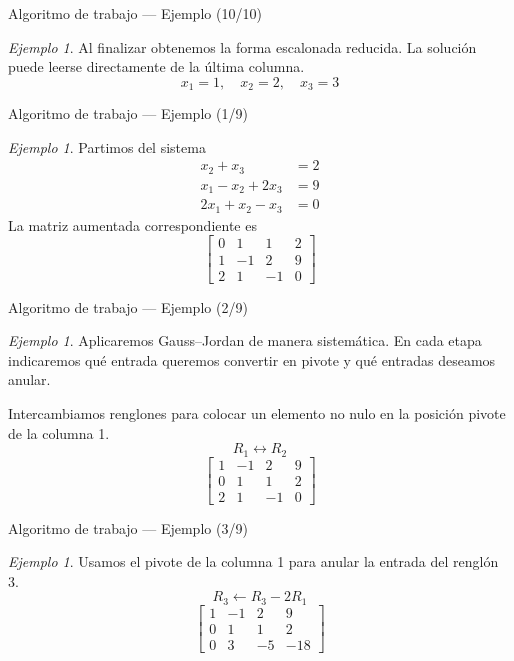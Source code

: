 \documentclass[aspectratio=169,11pt]{beamer}
\theoremstyle{remark}
\newtheorem{Ejem}[definicion]{Ejemplo}
\begin{document}
\begin{frame}{Algoritmo de trabajo — Ejemplo (10/10)}
\begin{Ejem}
Al finalizar obtenemos la forma escalonada reducida. La solución puede leerse directamente de la última columna.
\[
\boxed{x_{1}=1,\quad x_{2}=2,\quad x_{3}=3}
\]
\end{Ejem}
\end{frame}

\begin{frame}{Algoritmo de trabajo — Ejemplo (1/9)}
\begin{Ejem}
Partimos del sistema
\[
\begin{aligned}
x_{2} + x_{3} &= 2\\
x_{1} - x_{2} + 2 x_{3} &= 9\\
2 x_{1} + x_{2} - x_{3} &= 0
\end{aligned}
\]
La matriz aumentada correspondiente es
\[
\left[\begin{array}{ccc|c}
0 & 1 & 1 & 2\\
1 & -1 & 2 & 9\\
2 & 1 & -1 & 0
\end{array}\right]
\]
\end{Ejem}
\end{frame}

\begin{frame}{Algoritmo de trabajo — Ejemplo (2/9)}
\begin{Ejem}
Aplicaremos Gauss--Jordan de manera sistemática. En cada etapa indicaremos qué entrada queremos convertir en pivote y qué entradas deseamos anular.


Intercambiamos renglones para colocar un elemento no nulo en la posición pivote de la columna 1.
\[
R_{1}\leftrightarrow R_{2}
\]
\[
\left[\begin{array}{ccc|c}
1 & -1 & 2 & 9\\
0 & 1 & 1 & 2\\
2 & 1 & -1 & 0
\end{array}\right]
\]
\end{Ejem}
\end{frame}

\begin{frame}{Algoritmo de trabajo — Ejemplo (3/9)}
\begin{Ejem}
Usamos el pivote de la columna 1 para anular la entrada del renglón 3.
\[
R_{3}\leftarrow R_{3}-2R_{1}
\]
\[
\left[\begin{array}{ccc|c}
1 & -1 & 2 & 9\\
0 & 1 & 1 & 2\\
0 & 3 & -5 & -18
\end{array}\right]
\]
\end{Ejem}
\end{frame}
\end{document}
